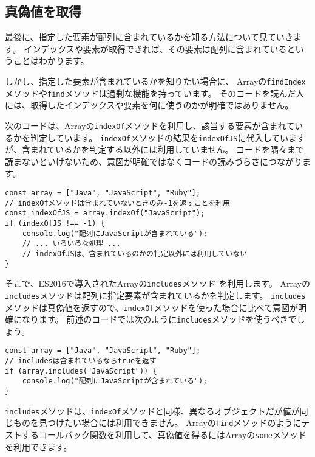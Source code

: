 \hypertarget{get-boolean}{%
\subsection{真偽値を取得}\label{get-boolean}}

最後に、指定した要素が配列に含まれているかを知る方法について見ていきます。
インデックスや要素が取得できれば、その要素は配列に含まれているということはわかります。

しかし、指定した要素が含まれているか\textbf{}を知りたい場合に、
Arrayの\texttt{findIndex}メソッドや\texttt{find}メソッドは過剰な機能を持っています。
そのコードを読んだ人には、取得したインデックスや要素を何に使うのかが明確ではありません。

次のコードは、Arrayの\texttt{indexOf}メソッドを利用し、該当する要素が含まれているかを判定しています。
\texttt{indexOf}メソッドの結果を\texttt{indexOfJS}に代入していますが、含まれているかを判定する以外には利用していません。
コードを隅々まで読まないといけないため、意図が明確ではなくコードの読みづらさにつながります。

\begin{lstlisting}
const array = ["Java", "JavaScript", "Ruby"];
// indexOfメソッドは含まれていないときのみ-1を返すことを利用
const indexOfJS = array.indexOf("JavaScript");
if (indexOfJS !== -1) {
    console.log("配列にJavaScriptが含まれている");
    // ... いろいろな処理 ...
    // indexOfJSは、含まれているのかの判定以外には利用していない
}
\end{lstlisting}

そこで、ES2016で導入されたArrayの\texttt{includes}メソッド\,\protect{}\,を利用します。
Arrayの\texttt{includes}メソッドは配列に指定要素が含まれているかを判定します。
\texttt{includes}メソッドは真偽値を返すので、\texttt{indexOf}メソッドを使った場合に比べて意図が明確になります。
前述のコードでは次のように\texttt{includes}メソッドを使うべきでしょう。

\begin{lstlisting}
const array = ["Java", "JavaScript", "Ruby"];
// includesは含まれているならtrueを返す
if (array.includes("JavaScript")) {
    console.log("配列にJavaScriptが含まれている");
}
\end{lstlisting}

\texttt{includes}メソッドは、\texttt{indexOf}メソッドと同様、異なるオブジェクトだが値が同じものを見つけたい場合には利用できません。
Arrayの\texttt{find}メソッドのようにテストするコールバック関数を利用して、真偽値を得るにはArrayの\texttt{some}メソッドを利用できます。

